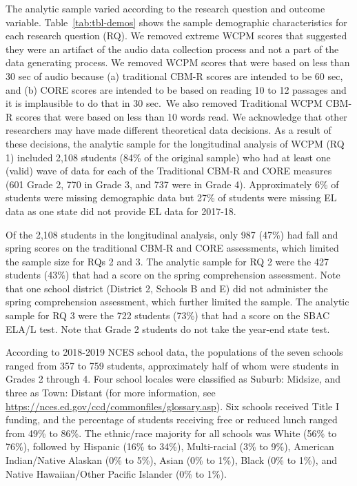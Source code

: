 \documentclass[
  english,
  man, fleqn, noextraspace]{apa6}
\begin{document}
The analytic sample varied according to the research question and outcome variable. Table~\ref{tab:tbl-demos} shows the sample demographic characteristics for each research question (RQ). We removed extreme WCPM scores that suggested they were an artifact of the audio data collection process and not a part of the data generating process. We removed WCPM scores that were based on less than 30 sec of audio because (a) traditional CBM-R scores are intended to be 60 sec, and (b) CORE scores are intended to be based on reading 10 to 12 passages and it is implausible to do that in 30 sec.~We also removed Traditional WCPM CBM-R scores that were based on less than 10 words read. We acknowledge that other researchers may have made different theoretical data decisions. As a result of these decisions, the analytic sample for the longitudinal analysis of WCPM (RQ 1) included 2,108 students (84\% of the original sample) who had at least one (valid) wave of data for each of the Traditional CBM-R and CORE measures (601 Grade 2, 770 in Grade 3, and 737 were in Grade 4). Approximately 6\% of students were missing demographic data but 27\% of students were missing EL data as one state did not provide EL data for 2017-18.

Of the 2,108 students in the longitudinal analysis, only 987 (47\%) had fall and spring scores on the traditional CBM-R and CORE assessments, which limited the sample size for RQs 2 and 3. The analytic sample for RQ 2 were the 427 students (43\%) that had a score on the spring comprehension assessment. Note that one school district (District 2, Schools B and E) did not administer the spring comprehension assessment, which further limited the sample. The analytic sample for RQ 3 were the 722 students (73\%) that had a score on the SBAC ELA/L test. Note that Grade 2 students do not take the year-end state test.

According to 2018-2019 NCES school data, the populations of the seven schools ranged from 357 to 759 students, approximately half of whom were students in Grades 2 through 4. Four school locales were classified as Suburb: Midsize, and three as Town: Distant (for more information, see \url{https://nces.ed.gov/ccd/commonfiles/glossary.asp}). Six schools received Title I funding, and the percentage of students receiving free or reduced lunch ranged from 49\% to 86\%. The ethnic/race majority for all schools was White (56\% to 76\%), followed by Hispanic (16\% to 34\%), Multi-racial (3\% to 9\%), American Indian/Native Alaskan (0\% to 5\%), Asian (0\% to 1\%), Black (0\% to 1\%), and Native Hawaiian/Other Pacific Islander (0\% to 1\%).
\end{document}
